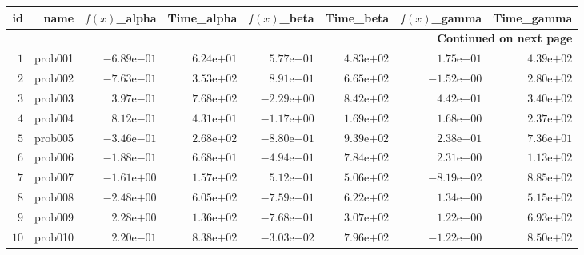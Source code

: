 \documentclass[varwidth=20cm,crop=true]{standalone}
\begin{document}
\begin{longtable}{rrrrrrrr}
\hline
id & name & \(f(x)\)\_alpha & Time\_alpha & \(f(x)\)\_beta & Time\_beta & \(f(x)\)\_gamma & Time\_gamma \\\hline
\endhead
\hline
\multicolumn{8}{r}{{\bfseries Continued on next page}}\\
\hline
\endfoot
\endlastfoot
\(     1\) & prob001 & \(-6.89\)e\(-01\) & \( 6.24\)e\(+01\) & \( 5.77\)e\(-01\) & \( 4.83\)e\(+02\) & \( 1.75\)e\(-01\) & \( 4.39\)e\(+02\) \\
\(     2\) & prob002 & \(-7.63\)e\(-01\) & \( 3.53\)e\(+02\) & \( 8.91\)e\(-01\) & \( 6.65\)e\(+02\) & \(-1.52\)e\(+00\) & \( 2.80\)e\(+02\) \\
\(     3\) & prob003 & \( 3.97\)e\(-01\) & \( 7.68\)e\(+02\) & \(-2.29\)e\(+00\) & \( 8.42\)e\(+02\) & \( 4.42\)e\(-01\) & \( 3.40\)e\(+02\) \\
\(     4\) & prob004 & \( 8.12\)e\(-01\) & \( 4.31\)e\(+01\) & \(-1.17\)e\(+00\) & \( 1.69\)e\(+02\) & \( 1.68\)e\(+00\) & \( 2.37\)e\(+02\) \\
\(     5\) & prob005 & \(-3.46\)e\(-01\) & \( 2.68\)e\(+02\) & \(-8.80\)e\(-01\) & \( 9.39\)e\(+02\) & \( 2.38\)e\(-01\) & \( 7.36\)e\(+01\) \\
\(     6\) & prob006 & \(-1.88\)e\(-01\) & \( 6.68\)e\(+01\) & \(-4.94\)e\(-01\) & \( 7.84\)e\(+02\) & \( 2.31\)e\(+00\) & \( 1.13\)e\(+02\) \\
\(     7\) & prob007 & \(-1.61\)e\(+00\) & \( 1.57\)e\(+02\) & \( 5.12\)e\(-01\) & \( 5.06\)e\(+02\) & \(-8.19\)e\(-02\) & \( 8.85\)e\(+02\) \\
\(     8\) & prob008 & \(-2.48\)e\(+00\) & \( 6.05\)e\(+02\) & \(-7.59\)e\(-01\) & \( 6.22\)e\(+02\) & \( 1.34\)e\(+00\) & \( 5.15\)e\(+02\) \\
\(     9\) & prob009 & \( 2.28\)e\(+00\) & \( 1.36\)e\(+02\) & \(-7.68\)e\(-01\) & \( 3.07\)e\(+02\) & \( 1.22\)e\(+00\) & \( 6.93\)e\(+02\) \\
\(    10\) & prob010 & \( 2.20\)e\(-01\) & \( 8.38\)e\(+02\) & \(-3.03\)e\(-02\) & \( 7.96\)e\(+02\) & \(-1.22\)e\(+00\) & \( 8.50\)e\(+02\) \\\hline
\end{longtable}
\end{document}
